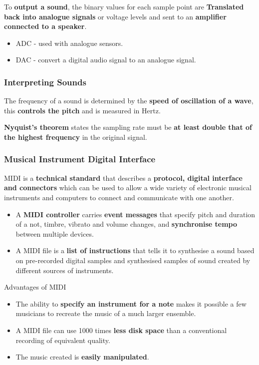 To \textbf{output a sound}, the binary values for each sample point are \textbf{Translated back into analogue signals} or voltage levels and sent to an \textbf{amplifier connected to a speaker}.
\begin{itemize}
    \item ADC - used with analogue sensors.
    \item DAC - convert a digital audio signal to an analogue signal.
\end{itemize}

\subsubsection*{Interpreting Sounds}

The frequency of a sound is determined by the \textbf{speed of oscillation of a wave}, this \textbf{controls the pitch} and is measured in Hertz.

\textbf{Nyquist's theorem} states the sampling rate must be \textbf{at least double that of the highest frequency} in the original signal.

\subsubsection*{Musical Instrument Digital Interface}

MIDI is a \textbf{technical standard} that describes a \textbf{protocol, digital interface and connectors} which can be used to allow a wide variety of electronic musical instruments and computers to connect and communicate with one another.

\begin{itemize}
    \item A \textbf{MIDI controller} carries \textbf{event messages} that specify pitch and duration of a not, timbre, vibrato and volume changes, and \textbf{synchronise tempo} between multiple devices.
    \item A MIDI file is a \textbf{list of instructions} that tells it to synthesise a sound based on pre-recorded digital samples and synthesised samples of sound created by different sources of instruments.
\end{itemize}

Advantages of MIDI
\begin{itemize}
    \item The ability to \textbf{specify an instrument for a note} makes it possible a few musicians to recreate the music of a much larger ensemble.
    \item A MIDI file can use 1000 times \textbf{less disk space} than a conventional recording of equivalent quality.
    \item The music created is \textbf{easily manipulated}.
\end{itemize}


